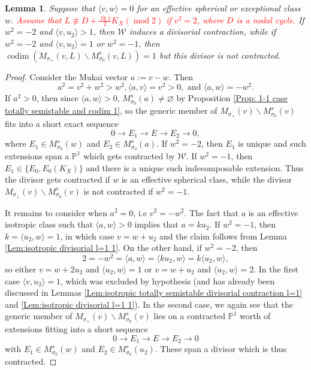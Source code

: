 \documentclass[leqno,11pt]{amsart}
\def\P{\ensuremath{\mathbb{P}}}
\def\codim{\mathop{\mathrm{codim}}\nolimits}
\def\mod{\mathop{\mathrm{mod}}\nolimits}
\def\rk{\mathop{\mathrm{rk}}}
\newtheorem{Lem}[Thm]{Lemma}
\theoremstyle{definition}
\def\P{\ensuremath{\mathbb{P}}}
\def\WW{\ensuremath{\mathcal W}}
\begin{document}
\begin{Lem}\label{Lem:isotropic divisorial 1-1 2}
Suppose that $\langle v,w\rangle=0$ for an effective spherical or exceptional class $w$.  
\textcolor{red}{Assume that $L \not \equiv D+\frac{\rk v}{2}K_X (\mod 2)$ if $v^2=2$, where $D$ is a nodal cycle.} 
If $w^2=-2$ and $\langle v,u_2\rangle>1$, then $\WW$ induces a divisorial contraction, while if $w^2=-2$ and $\langle v,u_2\rangle=1$ or $w^2=-1$, then $\codim(M_{\sigma_+}(v,L)\backslash M^s_{\sigma_0}(v,L))=1$ but this divisor is not contracted. 
\end{Lem}
\begin{proof}
Consider the Mukai vector $a:=v-w$.  Then $$a^2=v^2+w^2>w^2, \langle a,v \rangle=v^2>0,
\mbox{ and }\langle a,w\rangle=-w^2.$$  If $a^2>0$, then since $\langle a,w\rangle>0$, $M^s_{\sigma_0}(a)\neq\varnothing$ by Proposition \ref{Prop: 1-1 case totally semistable and codim 1}, so the generic member of $M_{\sigma_+}(v)\backslash M^s_{\sigma_0}(v)$ fits into a short exact sequence $$0\to E_1\to E\to E_2\to 0,$$ where $E_1\in M^s_{\sigma_0}(w)$ and $E_2\in M^s_{\sigma_0}(a)$.  If $w^2=-2$, then $E_1$ is unique and such extensions span a $\P^1$ which gets contracted by $\WW$.  If $w^2=-1$, then $E_1\in \{E_0,E_0(K_X)\}$ and there is a unique such indecomposable extension.  Thus the divisor gets contracted if $w$ is an effective spherical class, while the divisor $M_{\sigma_+}(v)\backslash M^s_{\sigma_0}(v)$ is not contracted if $w^2=-1$.  

It remains to consider when $a^2=0$, i.e $v^2=-w^2$.  The fact that $a$ is an effective isotropic class such that $\langle a,w\rangle>0$ implies that $a=ku_2$.  If $w^2=-1$, then $k=\langle u_2,w\rangle=1$, in which case $v=w+u_2$ and the claim follows from Lemma \ref{Lem:isotropic divisorial l=1 1}.  On the other hand, if $w^2=-2$, then $$2=-w^2=\langle a,w\rangle=\langle ku_2,w\rangle=k\langle u_2,w\rangle,$$ so either $v=w+2u_2$ and $\langle u_2,w\rangle=1$ or $v=w+u_2$ and $\langle u_2,w\rangle=2$.  In the first case $\langle v,u_2\rangle=1$, which was excluded by hypothesis (and has already been discussed in Lemmas \ref{Lem:isotropic totally semistable divisorial contraction l=1} and \ref{Lem:isotropic divisorial l=1 1}).  In the second case, we again see that the generic member of $M_{\sigma_+}(v)\backslash M^s_{\sigma_0}(v)$ lies on a contracted $\P^1$ worth of extensions fitting into a short sequence $$0\to E_1\to E\to E_2\to 0$$ with $E_1\in M^s_{\sigma_0}(w)$ and $E_2\in M^s_{\sigma_0}(u_2)$.  These span a divisor which is thus contracted.  
\end{proof}
\end{document}
